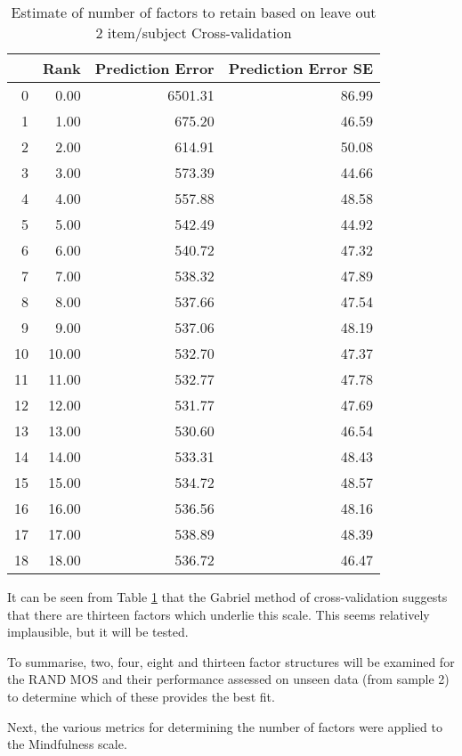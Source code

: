 \documentclass{article}
\begin{document}
\begin{table}[ht]
\centering
\begin{tabular}{rrrr}
  \hline
 & Rank & Prediction Error & Prediction Error SE \\ 
  \hline
0 & 0.00 & 6501.31 & 86.99 \\ 
  1 & 1.00 & 675.20 & 46.59 \\ 
  2 & 2.00 & 614.91 & 50.08 \\ 
  3 & 3.00 & 573.39 & 44.66 \\ 
  4 & 4.00 & 557.88 & 48.58 \\ 
  5 & 5.00 & 542.49 & 44.92 \\ 
  6 & 6.00 & 540.72 & 47.32 \\ 
  7 & 7.00 & 538.32 & 47.89 \\ 
  8 & 8.00 & 537.66 & 47.54 \\ 
  9 & 9.00 & 537.06 & 48.19 \\ 
  10 & 10.00 & 532.70 & 47.37 \\ 
  11 & 11.00 & 532.77 & 47.78 \\ 
  12 & 12.00 & 531.77 & 47.69 \\ 
  13 & 13.00 & 530.60 & 46.54 \\ 
  14 & 14.00 & 533.31 & 48.43 \\ 
  15 & 15.00 & 534.72 & 48.57 \\ 
  16 & 16.00 & 536.56 & 48.16 \\ 
  17 & 17.00 & 538.89 & 48.39 \\ 
  18 & 18.00 & 536.72 & 46.47 \\ 
   \hline
\end{tabular}
\caption{Estimate of number of factors to retain based on leave out 2 item/subject Cross-validation} 
\label{tab:randfactgabriel}
\end{table}
It can be seen from Table \ref{tab:randfactgabriel} that the Gabriel method of cross-validation suggests that there are thirteen factors which underlie this scale. This seems relatively implausible, but it will be tested. 

To summarise, two, four, eight and thirteen factor structures will be examined for the RAND MOS and their performance assessed on unseen data (from sample 2) to determine which of these provides the best fit. 

Next, the various metrics for determining the number of factors were applied to the Mindfulness scale. 
\end{document}
